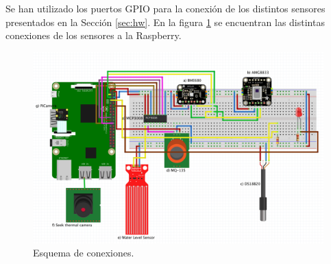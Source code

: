 Se han utilizado los puertos GPIO para la conexión de los distintos sensores presentados en la Sección \ref{sec:hw}. En la figura \ref{fig:esquema} se encuentran las distintas conexiones de los sensores a la Raspberry. 
\begin{figure} [h!]
  \begin{center}
    \includegraphics[width=14cm]{figs/esquema}
  \end{center}
  \caption{Esquema de conexiones.}
  \label{fig:esquema}
\end{figure}

